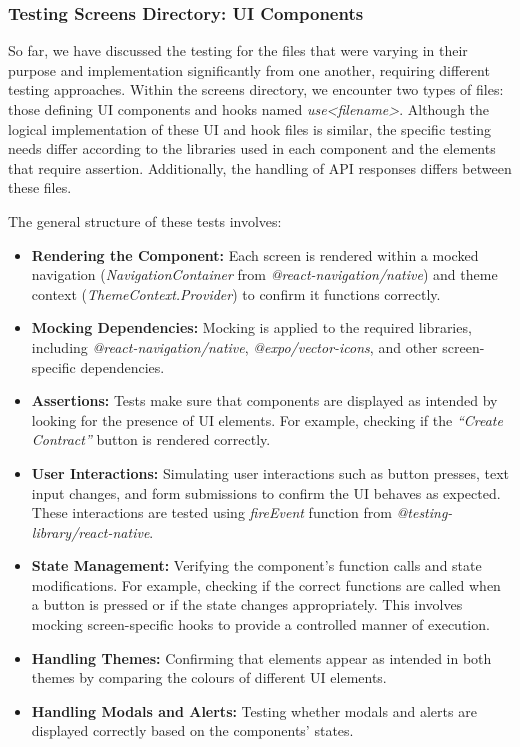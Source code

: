 \subsubsection{Testing Screens Directory: UI Components}

So far, we have discussed the testing for the files that were varying in their purpose and implementation significantly from one another, requiring different testing approaches. Within the screens directory, we encounter two types of files: those defining UI components and hooks named \textit{use<filename>}. Although the logical implementation of these UI and hook files is similar, the specific testing needs differ according to the libraries used in each component and the elements that require assertion. Additionally, the handling of API responses differs between these files.

The general structure of these tests involves:

\begin{itemize}
    \item \textbf{Rendering the Component:} Each screen is rendered within a mocked navigation (\textit{NavigationContainer} from \textit{@react-navigation/native}) and theme context (\textit{ThemeContext.Provider}) to confirm it functions correctly.
    \item \textbf{Mocking Dependencies:} Mocking is applied to the required libraries, including \textit{@react-navigation/native}, \textit{@expo/vector-icons}, and other screen-specific dependencies.
    \item \textbf{Assertions:} Tests make sure that components are displayed as intended by looking for the presence of UI elements. For example, checking if the \textit{``Create Contract''} button is rendered correctly.
    \item \textbf{User Interactions:} Simulating user interactions such as button presses, text input changes, and form submissions to confirm the UI behaves as expected. These interactions are tested using \textit{fireEvent} function from \textit{@testing-library/react-native}.
    \item \textbf{State Management:} Verifying the component's function calls and state modifications. For example, checking if the correct functions are called when a button is pressed or if the state changes appropriately. This involves mocking screen-specific hooks to provide a controlled manner of execution.
    \item \textbf{Handling Themes:} Confirming that elements appear as intended in both themes by comparing the colours of different UI elements.
    \item \textbf{Handling Modals and Alerts:} Testing whether modals and alerts are displayed correctly based on the components' states.
\end{itemize}

